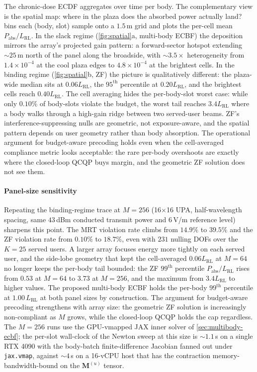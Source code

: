 \documentclass[journal,twocolumn,10pt]{IEEEtran}
\theoremstyle{plain}
\theoremstyle{remark}
\newcommand{\Pabs}{P_{\mathrm{abs}}}
\newcommand{\Mmat}{\mathbf{M}}
\begin{document}
The chronic-dose ECDF aggregates over time per body. The
complementary view is the spatial map: where in the plaza does the
absorbed power actually land?  bins each
(body, slot) sample onto a $1.5\,$m grid and plots the per-cell mean
$\Pabs/L_{\mathrm{RL}}$. In the slack regime
(\cref{fig:spatial}a, multi-body ECBF) the deposition mirrors the
array's projected gain pattern: a forward-sector hotspot extending
$\sim 25\,$m north of the panel along the broadside, with
$\sim 3.5\times$ heterogeneity from $1.4\times 10^{-4}$ at the cool
plaza edges to $4.8\times 10^{-4}$ at the brightest cells. In the
binding regime (\cref{fig:spatial}b, ZF) the picture is qualitatively
different: the plaza-wide median sits at $0.06 L_{\mathrm{RL}}$, the
$95^{\mathrm{th}}$ percentile at $0.20 L_{\mathrm{RL}}$, and the
brightest cells reach $0.40 L_{\mathrm{RL}}$. The cell averaging hides
the per-body-slot worst case: while only $0.10\%$ of body-slots
violate the budget, the worst tail reaches $3.4 L_{\mathrm{RL}}$
where a body walks through a high-gain ridge between two served-user
beams. ZF's interference-suppressing nulls are geometric, not
exposure-aware, and the spatial pattern depends on user geometry
rather than body absorption. The operational argument for
budget-aware precoding holds even when the cell-averaged compliance
metric looks acceptable: the rare per-body overshoots are exactly
where the closed-loop QCQP buys margin, and the geometric ZF
solution does not see them.

\paragraph*{Panel-size sensitivity}\label{par:panel-size-spatial}
Repeating the binding-regime trace at $M = 256$ (16$\times$16 UPA, half-wavelength spacing, same $43\,$dBm conducted transmit power and $6\,$V/m reference level) sharpens this point. The MRT violation rate climbs from $14.9\%$ to $39.5\%$ and the ZF violation rate from $0.10\%$ to $18.7\%$, even with $231$ nulling DOFs over the $K = 25$ served users. A larger array focuses energy more tightly on each served user, and the side-lobe geometry that kept the cell-averaged $0.06 L_{\mathrm{RL}}$ at $M = 64$ no longer keeps the per-body tail bounded: the ZF $99^{\mathrm{th}}$ percentile $\Pabs/L_{\mathrm{RL}}$ rises from $0.53$ at $M = 64$ to $3.73$ at $M = 256$, and the maximum from $3.4 L_{\mathrm{RL}}$ to higher values. The proposed multi-body ECBF holds the per-body $99^{\mathrm{th}}$ percentile at $1.00\,L_{\mathrm{RL}}$ at both panel sizes by construction. The argument for budget-aware precoding strengthens with array size: the geometric ZF solution is increasingly non-compliant as $M$ grows, while the closed-loop QCQP holds the cap regardless. The $M = 256$ runs use the GPU-vmapped JAX inner solver of \cref{sec:multibody-ecbf}; the per-slot wall-clock of the Newton sweep at this size is $\sim 1.1\,$s on a single RTX 4090 with the body-batch finite-difference Jacobian fanned out under \texttt{jax.vmap}, against $\sim 4\,$s on a 16-vCPU host that has the contraction memory-bandwidth-bound on the $\Mmat^{(u)}$ tensor.
\end{document}
